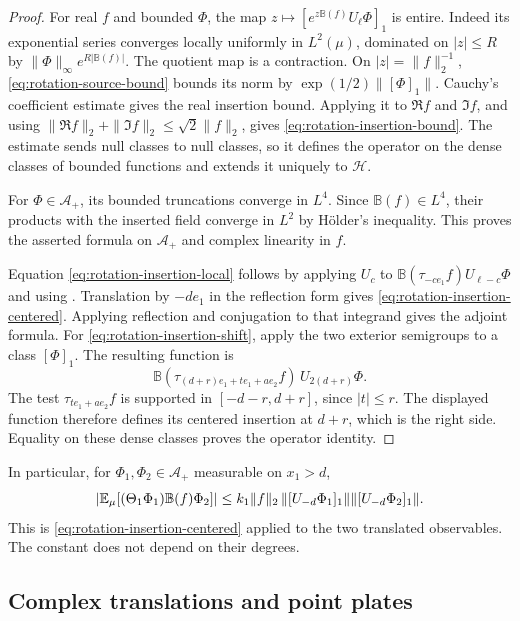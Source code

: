\begin{proof}
For real $f$ and bounded $\Phi$, the map
$z\mapsto[e^{z\mathbb B(f)}U_\ell\Phi]_1$ is entire.
Indeed its exponential series converges locally uniformly in
$L^2(\mu)$, dominated on $|z|\le R$ by
$\|\Phi\|_\infty e^{R|\mathbb B(f)|}$.
The quotient map is a contraction. On $|z|=\|f\|_2^{-1}$,
\eqref{eq:rotation-source-bound} bounds its norm by
$\exp(1/2)\|[\Phi]_1\|$. Cauchy's coefficient estimate gives the
real insertion bound. Applying it to $\Re f$ and $\Im f$, and using
$\|\Re f\|_2+\|\Im f\|_2\le\sqrt2\|f\|_2$, gives
\eqref{eq:rotation-insertion-bound}.
The estimate sends null classes to null classes, so it defines the
operator on the dense classes of bounded functions and extends it
uniquely to $\mathcal H$.

For $\Phi\in\mathcal A_+$, its bounded truncations converge in $L^4$.
Since $\mathbb B(f)\in L^4$, their products with the inserted field
converge in $L^2$ by H\"older's inequality. This proves the asserted
formula on $\mathcal A_+$ and complex linearity in $f$.

Equation \eqref{eq:rotation-insertion-local} follows by applying
$U_c$ to
$\mathbb B(\tau_{-ce_1}f)U_{\ell-c}\Phi$ and using
. Translation by $-de_1$ in the reflection
form gives \eqref{eq:rotation-insertion-centered}. Applying reflection
and conjugation to that integrand gives the adjoint formula.
For \eqref{eq:rotation-insertion-shift}, apply the two exterior
semigroups to a class $[\Phi]_1$. The resulting function is
\[
 \mathbb B(\tau_{(d+r)e_1+te_1+ae_2}f)\,
       U_{2(d+r)}\Phi.
\]
The test $\tau_{te_1+ae_2}f$ is supported in $[-d-r,d+r]$,
since $|t|\le r$. The displayed function therefore defines its centered
insertion at $d+r$, which is the right side. Equality on these dense
classes proves the operator identity.
\end{proof}

In particular, for $\Phi_1,\Phi_2\in\mathcal A_+$ measurable on
$x_1>d$,
\begin{equation}\label{eq:rotation-separated-insertion}
 |\mathbb E_\mu[(\Theta_1\Phi_1)\mathbb B(f)\Phi_2]|
 \le k_1\|f\|_2\,\|[U_{-d}\Phi_1]_1\|
                         \|[U_{-d}\Phi_2]_1\|.
\end{equation}
This is \eqref{eq:rotation-insertion-centered} applied to the two
translated observables. The constant does not depend on their degrees.

\subsection{Complex translations and point plates}
\label{subsec:rotation-point-plates}

